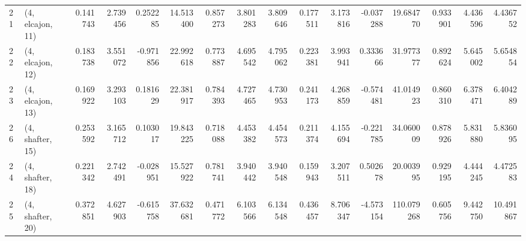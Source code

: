 \begin{tabular}{llrrrrrrrrrrrrrr}
21 &  (4, elcajon, 11) &   0.141743 &  2.739456 &  0.252285 &  14.513400 &  0.857273 &   3.801283 &  3.809646 &  0.177511 &   3.173816 & -0.037288 &   19.684770 &  0.933901 &   4.436596 &   4.436752 \\
22 &  (4, elcajon, 12) &   0.183738 &  3.551072 & -0.971856 &  22.992618 &  0.773887 &   4.695542 &  4.795062 &  0.223381 &   3.993941 &  0.333666 &   31.977377 &  0.892624 &   5.645002 &   5.654854 \\
23 &  (4, elcajon, 13) &   0.169922 &  3.293103 &  0.181629 &  22.381917 &  0.784393 &   4.727465 &  4.730953 &  0.241173 &   4.268859 & -0.574481 &   41.014923 &  0.860310 &   6.378471 &   6.404289 \\
26 &  (4, shafter, 15) &   0.253592 &  3.165712 &  0.103017 &  19.843225 &  0.718088 &   4.453382 &  4.454573 &  0.211374 &   4.155694 & -0.221785 &   34.060009 &  0.878926 &   5.831880 &   5.836095 \\
24 &  (4, shafter, 18) &   0.221342 &  2.742491 & -0.028951 &  15.527922 &  0.781741 &   3.940442 &  3.940548 &  0.159943 &   3.207511 &  0.502678 &   20.003995 &  0.929195 &   4.444245 &   4.472583 \\
25 &  (4, shafter, 20) &   0.372851 &  4.627903 & -0.615758 &  37.632681 &  0.471772 &   6.103566 &  6.134548 &  0.436457 &   8.706347 & -4.573154 &  110.079268 &  0.605756 &   9.442750 &  10.491867 \\
\bottomrule
\end{tabular}
